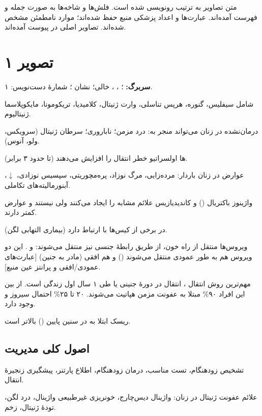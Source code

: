 \documentclass[12pt,a4paper]{article}
\begin{document}
\fi
\providecommand{\STIpage}[1]{\clearpage\section*{تصویر #1}}
\providecommand{\STIunclear}[1]{\textbf{[خوانش نامطمئن: #1]}}
\providecommand{\STIm}[1]{\lr{\(#1\)}}
\begin{center}\Large\bfseries{}\end{center}
متن تصاویر به ترتیب رونویسی شده است. فلش‌ها و شاخه‌ها به صورت جمله و فهرست آمده‌اند. عبارت‌ها و اعداد پزشکی منبع حفظ شده‌اند؛ موارد نامطمئن مشخص شده‌اند. تصاویر اصلی در پیوست آمده‌اند.
\STIpage{۱}
\textbf{سربرگ:} ؛ ، ،  خالی؛ نشان ؛ شمارهٔ دست‌نویس: ۱.

 شامل سیفلیس، گنوره، هرپس تناسلی، وارت ژنیتال، کلامیدیا، تریکومونا، مایکوپلاسما ژنیتالیوم.

 درمان‌نشده در زنان می‌تواند منجر به: درد مزمن؛ ناباروری؛ سرطان ژنیتال (سرویکس، ولو، آنوس).

ها اولسراتیو خطر انتقال  را افزایش می‌دهند (تا حدود ۳ برابر).

عوارض  در زنان باردار: مرده‌زایی، مرگ نوزاد، پره‌مچوریتی، سپسیس نوزادی، $\downarrow$، آبنورمالیته‌های تکاملی.

واژینوز باکتریال () و کاندیدیازیس علائم مشابه  را ایجاد می‌کنند ولی  نیستند و عوارض کمتر دارند.

 (بیماری التهابی لگن) در برخی از کیس‌ها با  ارتباط دارد.

ویروس‌ها منتقل از راه خون، از طریق رابطهٔ جنسی نیز منتقل می‌شوند:  و .
این دو ویروس هم به طور عمودی منتقل می‌شوند () و هم افقی (مادر به جنین) [عبارت‌های عمودی/افقی و پرانتز عین منبع].

مهم‌ترین روش انتقال ، انتقال در دورهٔ جنینی یا طی ۱ سال اول زندگی است.
از بین این افراد ۹۰\% مبتلا به عفونت مزمن هپاتیت  می‌شوند.
۲۰ تا ۲۵\% احتمال سیروز و  وجود دارد.

ریسک ابتلا به  در سنین پایین (\STIm{<25}) بالاتر است.
\subsection*{اصول کلی مدیریت }
تشخیص زودهنگام، تست مناسب، درمان زودهنگام، اطلاع پارتنر، پیشگیری زنجیرهٔ انتقال.

علائم عفونت ژنیتال در زنان: واژینال دیس‌چارج، خونریزی غیرطبیعی واژینال، درد لگن، تودهٔ ژنیتال، زخم.
\end{document}
